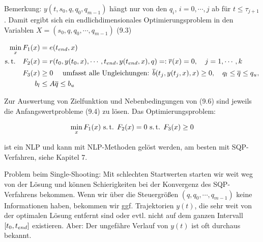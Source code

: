 Bemerkung: $y(t,s_0,q,q_0,q_{m-1})$ hängt nur von den $q_i$, $i=0,\cdots,j$ ab für $t \leq \tau_{j+1}$. Damit ergibt sich ein endlichdimensionales Optimierungsproblem in den Variablen $X=(s_0,q,q_0,\cdots,q_{m-1})$ (9.3)

\begin{align*}
\min_x F_1(x) &= e({t_{end}}, x) \\
\text{s.\,t.} \quad F_2(x) &= r(t_0, y(t_0, x), \cdots, {t_{end}}, y({t_{end}}, x), q) =: \overline r(x) = 0, \quad j=1,\cdots,k\\
F_3(x) & \geq 0 \quad \text{ umfasst alle Ungleichungen: } \overline b(t_j,y(t_j,x),x) \geq 0, \quad q_l \leq \overline q \leq q_u, \\
b_l & \leq A \overline q \leq b_u \\
\end{align*}

Zur Auswertung von Zielfunktion und Nebenbedingungen von (9.6) sind jeweils die Anfangswertprobleme (9.4) zu lösen. Das Optimierungsproblem:

\begin{align*}
\min_x F_1(x) \text{ s.\,t. } F_2(x) = 0 \text{ s.\,t. } F_3(x) \geq 0 
\end{align*}

ist ein NLP und kann mit NLP-Methoden gelöst werden, am besten mit SQP-Verfahren, siehe Kapitel 7.


Problem beim Single-Shooting: Mit schlechten Startwerten starten wir weit weg von der Lösung und können Schierigkeiten bei der Konvergenz des SQP-Verfahrens bekommen. Wenn wir über die Steuergrößen $(q, q_0, \cdots,q_{m-1})$ keine Informationen haben, bekommen wir ggf. Trajektorien $y(t)$, die sehr weit von der optimalen Lösung entfernt sind oder evtl. nicht auf dem ganzen Intervall $[t_0, {t_{end}}]$ existieren. Aber: Der ungefähre Verlauf von $y(t)$ ist oft durchaus bekannt.


